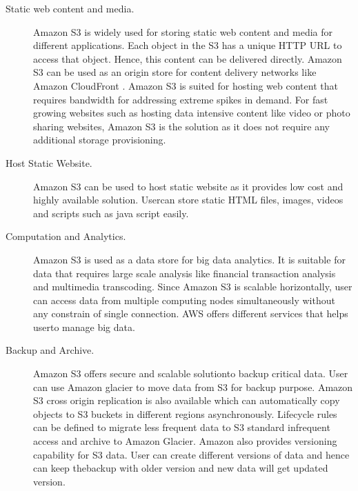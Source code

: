 \begin{description}
\item [Static web content and media.] Amazon S3 is widely used for
  storing static web content and media for different
  applications. Each object in the S3 has a unique HTTP URL to access
  that object. Hence, this content can be delivered directly. Amazon
  S3 can be used as an origin store for content delivery networks like
  Amazon CloudFront \cite{?}.  Amazon S3 is suited for hosting web
  content that requires bandwidth for addressing extreme spikes in
  demand. For fast growing websites such as hosting data intensive
  content like video or photo sharing websites, Amazon S3 is the
  solution as it does not require any additional storage provisioning.
 
\item [Host Static Website.]  Amazon S3 can be used to host static
  website as it provides low cost and highly available
  solution. User\GE can store static HTML files, images, videos and scripts such as java script
  easily.

\item [Computation and Analytics.]  Amazon S3 is used as a data store
  for big data analytics. It is suitable for data that requires large
  scale analysis like financial transaction analysis and multimedia
  transcoding. Since Amazon
  S3 is scalable horizontally, user can access data from multiple
  computing nodes simultaneously without any constrain of single
  connection. AWS offers different services that helps user\GE to manage
  big data.

\item [Backup and Archive.]  Amazon S3 offers secure and scalable
  solution\GE to backup critical data. User can use Amazon glacier
  \cite{?} to move data from S3 for backup purpose. Amazon S3 cross
  origin replication is also available which can automatically copy\GE
  objects to S3 buckets in different regions
  asynchronously.
  Lifecycle rules can be defined to migrate less frequent data to S3
  standard infrequent access and archive to Amazon Glacier. Amazon
  also provides versioning capability for S3 data. User can create
  different versions of data and hence can keep the\GE backup with older
  version and new data will get updated version.

\end{description}

